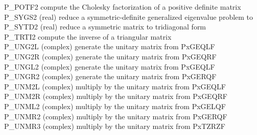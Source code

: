 \documentclass[11pt]{report}
\begin{document}
\begin{tabbing}
P\_POTF2 \> compute the Cholesky factorization of a positive definite matrix \\
P\_SYGS2 \> (real) reduce a symmetric-definite generalized eigenvalue problem to \\
P\_SYTD2 \> (real) reduce a symmetric matrix to tridiagonal form \\
P\_TRTI2 \> compute the inverse of a triangular matrix \\
P\_UNG2L \> (complex) generate the unitary matrix from PxGEQLF \\
P\_UNG2R \> (complex) generate the unitary matrix from PxGEQRF \\
P\_UNGL2 \> (complex) generate the unitary matrix from PxGEQLF \\
P\_UNGR2 \> (complex) generate the unitary matrix from PxGERQF \\
P\_UNM2L \> (complex) multiply by the unitary matrix from PxGEQLF \\
P\_UNM2R \> (complex) multiply by the unitary matrix from PxGEQRF \\
P\_UNML2 \> (complex) multiply by the unitary matrix from PxGELQF \\
P\_UNMR2 \> (complex) multiply by the unitary matrix from PxGERQF \\
P\_UNMR3 \> (complex) multiply by the unitary matrix from PxTZRZF
\end{tabbing}
\end{document}
